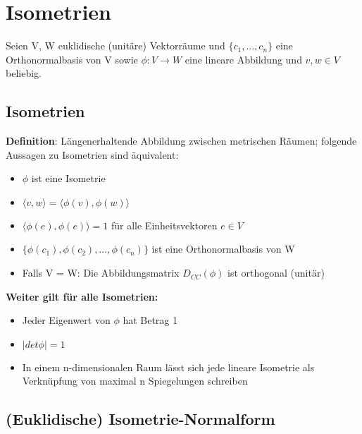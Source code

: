 \section{Isometrien}
Seien V, W euklidische (unitäre) Vektorräume und $\{c_1, ..., c_n\}$ eine Orthonormalbasis von V sowie $\phi: V \rightarrow W$ eine lineare Abbildung und $v, w \in V$ beliebig.

\subsection{Isometrien}%
\label{os:sub:isometrien}	

\textbf{Definition}: Längenerhaltende Abbildung zwischen metrischen Räumen; folgende Aussagen zu Isometrien sind äquivalent:
\begin{itemize}
	\item $\phi$ ist eine Isometrie
	\item $\langle v, w\rangle = \langle \phi(v), \phi(w)\rangle$
	\item $\langle \phi(e), \phi(e)\rangle = 1$ für alle Einheitsvektoren $e \in V$
	\item $\{\phi(c_1), \phi(c_2), ..., \phi(c_n)\}$ ist eine Orthonormalbasis von W
	\item Falls V = W: Die Abbildungsmatrix $D_{CC}(\phi)$ ist orthogonal (unitär)
\end{itemize}
\textbf{Weiter gilt für alle Isometrien:}
\begin{itemize}
	\item Jeder Eigenwert von $\phi$ hat Betrag 1
	\item $|det \phi| = 1$
	\item In einem n-dimensionalen Raum lässt sich jede lineare Isometrie als Verknüpfung von maximal n Spiegelungen schreiben
\end{itemize}

\subsection{(Euklidische) Isometrie-Normalform}%
\label{os:sub:euklidische_isometrie_normalform}


